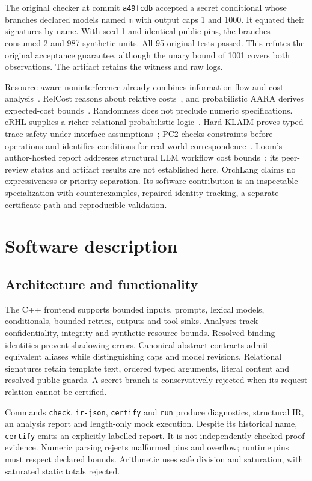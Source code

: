 \documentclass[preprint,12pt,a4paper]{elsarticle}
\begin{document}
The original checker at commit \texttt{a49fcdb} accepted a secret conditional
whose branches declared models named \texttt{m} with output caps 1 and 1000.
It equated their signatures by name. With seed 1 and identical public pins,
the branches consumed 2 and 987 synthetic units. All 95 original tests passed.
This refutes the original acceptance guarantee, although the unary bound of
1001 covers both observations. The artifact retains the witness and raw logs.

Resource-aware noninterference already combines information flow and cost
analysis~\cite{ngo}. RelCost reasons about relative costs~\cite{relcost}, and
probabilistic AARA derives expected-cost bounds~\cite{wang}. Randomness does
not preclude numeric specifications. eRHL supplies a richer relational
probabilistic logic~\cite{erhl}. Hard-KLAIM proves typed trace safety under
interface assumptions~\cite{hard}; PC2 checks constraints before operations
and identifies conditions for real-world correspondence~\cite{pc2}. Loom's
author-hosted report addresses structural LLM workflow cost bounds~\cite{loom};
its peer-review status and artifact results are not established here.
OrchLang claims no expressiveness or priority separation. Its software
contribution is an inspectable specialization with counterexamples, repaired
identity tracking, a separate certificate path and reproducible validation.

\section{Software description}
\subsection{Architecture and functionality}
The C++ frontend supports bounded inputs, prompts, lexical models, conditionals,
bounded retries, outputs and tool sinks. Analyses track confidentiality,
integrity and synthetic resource bounds. Resolved binding identities prevent
shadowing errors. Canonical abstract contracts admit equivalent aliases while
distinguishing caps and model revisions. Relational signatures retain template
text, ordered typed arguments, literal content and resolved public guards.
A secret branch is conservatively rejected when its request relation cannot
be certified.

Commands \texttt{check}, \texttt{ir-json}, \texttt{certify} and \texttt{run}
produce diagnostics, structural IR, an analysis report and length-only mock
execution. Despite its historical name, \texttt{certify} emits an explicitly
labelled report. It is not independently checked proof evidence. Numeric
parsing rejects malformed pins and overflow; runtime pins must respect declared
bounds. Arithmetic uses safe division and saturation, with saturated static
totals rejected.
\end{document}
